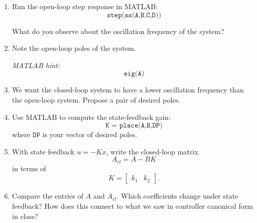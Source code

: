 \documentclass{ee122_notes}
\begin{document}
\begin{enumerate}[label=\textbf{Task \arabic*.}, leftmargin=*]

\item Run the open-loop step response in MATLAB:
\[
\texttt{step(ss(A,B,C,D))}
\]

What do you observe about the oscillation frequency of the system?

\vspace{2cm}

\item Note the open-loop poles of the system.

\textit{MATLAB hint:}
\[
\texttt{eig(A)}
\]

\vspace{1.5cm}

\item We want the closed-loop system to have a lower oscillation frequency than the open-loop system. Propose a pair of desired poles.

\vspace{2cm}

\item Use MATLAB to compute the state-feedback gain:
\[
\texttt{K = place(A,B,DP)}
\]
where \(\texttt{DP}\) is your vector of desired poles.

\vspace{1.5cm}

\item With state feedback \(u=-Kx\), write the closed-loop matrix
\[
A_{cl}=A-BK
\]
in terms of
\[
K=\begin{bmatrix}k_1 & k_2\end{bmatrix}.
\]

\vspace{2.2cm}

\item Compare the entries of \(A\) and \(A_{cl}\). Which coefficients change under state feedback? How does this connect to what we saw in controller canonical form in class?

\vspace{2.2cm}


\end{enumerate}
\end{document}
